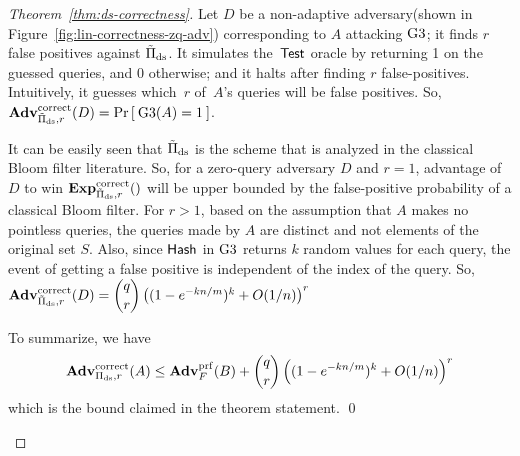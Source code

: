 \begin{proof}[Theorem~\ref{thm:ds-correctness}]
Let $D$ be a non-adaptive adversary(shown in Figure~\ref{fig:lin-correctness-zq-adv}) corresponding to $A$ attacking $\text{G3}$; it finds $r$ false positives against $\tilde{\Pi}_{\mathrm{ds}}$. It simulates the~$\mathsf{Test}$ oracle by returning 1 on the guessed queries, and 0 otherwise; and it halts after finding $r$ false-positives. Intuitively, it  guesses which~$r$ of~$A$'s queries will be false positives.  So, $\mathrm{\mathbf{Adv}}^{\mathrm{correct}}_{\tilde{\Pi}_{\mathrm{ds}},r}(D) = \Pr\left[\: \text{G3}(A) = 1 \:\right]$.

It can be easily seen that  $\tilde{\Pi}_{\mathrm{ds}}$ is the scheme that is analyzed in the classical Bloom filter literature. So, for a zero-query adversary $D$ and $r=1$, advantage of $D$ to win $\ExpCorrect{\tilde{\setprim}_{\mathrm{ds}},r}$ will be upper bounded by the false-positive probability of a classical Bloom filter. For $r > 1$, based on the assumption that $A$ makes no pointless queries, the queries made by $A$ are distinct and not elements of the original set $S$. Also, since $\mathsf{Hash}$ in $\text{G3}$ returns $k$ random values for each query, the event of getting a false positive is independent of the index of the query. So, $\mathrm{\mathbf{Adv}}^{\mathrm{correct}}_{\tilde{\Pi}_{\mathrm{ds}},r}(D) =   {\dbinom{q}{r}} \left( (1-e^{-kn/m})^k + O(1/n) \right)^r$

\noindent
To summarize, we have
\[
\mathrm{\mathbf{Adv}}^{\mathrm{correct}}_{\Pi_{\mathrm{ds}},r}(A) \leq  \mathbf{Adv}^{\mathrm{prf}}_{F}(B)  + {\dbinom{q}{r}} \left( (1-e^{-kn/m})^k + O(1/n) \right)^r
\]
which is the bound claimed in the theorem statement. \hfill \qed

\begin{figure}[tp]
\end{figure}
\end{proof}
